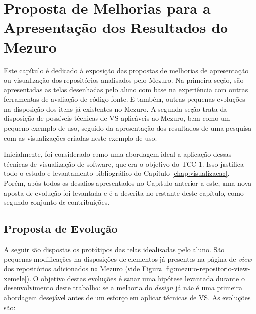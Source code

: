 \chapter{Proposta de Melhorias para a Apresentação dos Resultados do Mezuro}
\label{chap:proposta}

Este capítulo é dedicado à exposição das propostas de melhorias de apresentação
ou visualização dos repositórios analisados pelo Mezuro. Na primeira seção, são
apresentadas as telas desenhadas pelo aluno com base na experiência com outras
ferramentas de avaliação de código-fonte. E também, outras pequenas evoluções
na disposição dos itens já existentes no Mezuro. A segunda seção trata da
disposição de possíveis técnicas de VS aplicáveis ao Mezuro, bem como um pequeno
exemplo de uso, seguido da apresentação dos resultados de uma pesquisa com as
visualizações criadas neste exemplo de uso.

Inicialmente, foi considerado como uma abordagem ideal a aplicação dessas
técnicas de visualização de software, que era o objetivo do TCC 1. Isso
justifica todo o estudo e levantamento bibliográfico do Capítulo
\ref{chap:visualizacao}. Porém, após todos os desafios apresentados no Capítulo
anterior a este, uma nova aposta de evolução foi levantada e é a descrita no
restante deste capítulo, como segundo conjunto de contribuições.

\section{Proposta de Evolução}

A seguir são dispostas os protótipos das telas idealizadas pelo aluno. São
pequenas modificações na disposições de elementos já presentes na página de
\textit{view} dos repositórios adicionados no Mezuro (vide Figura
\ref{fig:mezuro-repositorio-view-xemele}). O objetivo destas evoluções é sanar
uma hipótese levantada durante o desenvolvimento deste trabalho: se a melhoria do
\textit{design} já não é uma primeira abordagem desejável antes  de um esforço
em aplicar técnicas de VS. As evoluções são:

